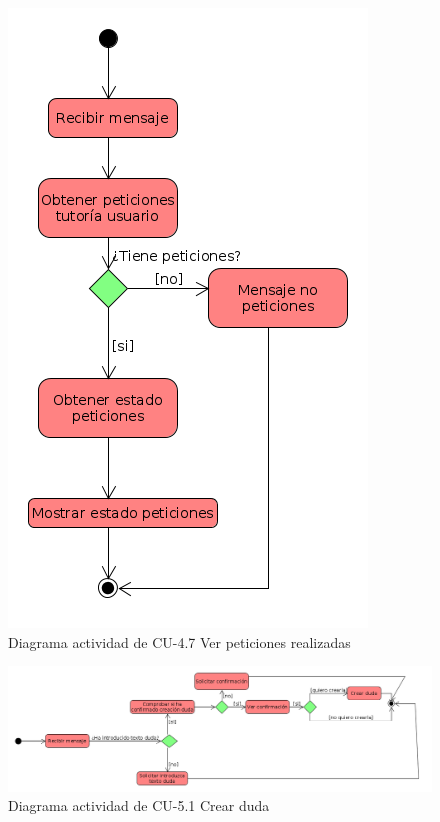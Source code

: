         \begin{figure}[!ht] %
\centering
\includegraphics[scale=0.5]{imagenes/diagramas/actividad/ver_peticiones_realizadass.png}  %

\caption{Diagrama actividad de CU-4.7 Ver peticiones realizadas}\label{figura147}
\end{figure}

        \begin{figure}[!ht] %
\centering
\includegraphics[scale=0.3]{imagenes/diagramas/actividad/crear_duda.png}  %

\caption{Diagrama actividad de CU-5.1 Crear duda}\label{figura148}
\end{figure}


